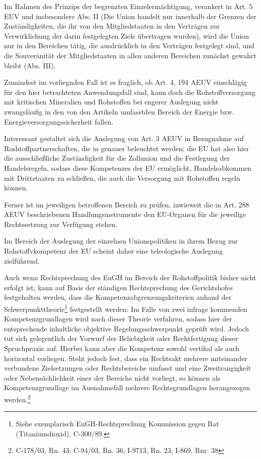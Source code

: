 \documentclass[12pt,a4paper,oneside]{book} %
\begin{document}
	Im Rahmen des Prinzips der begrenzten Einzelermächtigung, verankert in Art. 5 EUV  und insbesondere Abs. II (Die Union handelt nur innerhalb der Grenzen der Zuständigkeiten, die ihr von den Mitgliedstaaten in den Verträgen zur Verwirklichung der darin festgelegten Ziele übertragen wurden), wird die Union nur in den Bereichen tätig, die ausdrücklich in den Verträgen festgelegt sind, und  die Souveränität der Mitgliedstaaten in allen anderen Bereichen zunächst gewahrt bleibt (Abs. III).
	
	Zumindest im vorliegnden Fall ist es fraglich, ob Art. 4, 194 AEUV einschlägig für den hier betrachteten Anwendungsfall sind, kann doch die Rohstoffversorgung mit kritischen Mineralien und Rohstoffen bei engerer Auslegung nicht zwangsläufig in den von den Artikeln umfasstden Bereich der Energie bzw. Energieversorgungssicherheit fallen.
	
	Interessant gestaltet sich die Auslegung von Art. 3 AEUV in Bezugnahme auf Roshtoffpartnerschaften, die in %
	genauer beleuchtet werden; die EU hat also hier die ausschließliche Zuständigkeit für die Zollunion und die Festlegung der Handelsregeln, sodass diese Kompetenzes der EU ermöglicht, Handelsabkommen mit Drittstaaten zu schließen, die auch die Versorgung mit Rohstoffen regeln können.
	
	Ferner ist im jeweiligen betroffenen Bereich zu prüfen, inwieweit die in Art. 288 AEUV beschriebenen Handlungsinstrumente den EU-Organen für die jeweilige Rechtssetzung zur Verfügung stehen.
	
	Im Bereich der Auslegung der einzelnen Unionspolitiken in ihrem Bezug zur Rohstoffvkompetenz der EU scheint daher eine teleologische Auslegung zielführend.
	
	Auch wenn Rechtsprechung des EuGH im Bereich der Rohstoffpolitik bisher nicht erfolgt ist, kann auf Basis der ständigen Rechtsprechung des Gerichtshofes festgehalten werden, dass die Kompetenzabgrenzungskriterien anhand der \glqq Schwerpunkttheorie\grqq\footnote{Siehe exemplarisch EuGH-Rechtsprechung Kommission gegen Rat (Titaniumdioxid), C-300/89.} festgestellt werden: Im Falle von zwei infrage kommenden Kompetenzgrundlagen wird nach dieser Theorie verfahren, sodass hier der entsprechende inhaltliche objektive Regelungsschwerpunkt geprüft wird\autocite[Callies, Art. 175, Rn 22 sowie Kahl, Art. 95, Rn 73ff]{callies_euvaeuv_2022}. Jedoch tut sich gelegentlich der Vorwurf der Beliebigkeit oder Rechtfertigung dieser Spruchpraxis auf.\autocite{Nettesheim, Grabits/Hilf/Nettesheim, AEUV Art 194 Rn. 35} Hierbei kann aber die Kompetenz sowohl vertikal als auch horizontal vorliegen.\autocite[30f.]{callies_stellungnahme_2007} Steht jedoch fest, dass ein Rechtsakt mehrere miteinander verbundene Zielsetzungen oder Rechtsbereiche umfasst und eine Zweitrangigkeit oder Nebensächlichkeit einer der Bereiche nicht vorliegt, so können als Kompetenzgrundlage im Ausnahmefall mehrere Rechtsgrundlagen herangezogen werden.\footnote{C-178/03, Rn. 43; C-94/03, Rn. 36; I-9713, Rn. 23;  I-869, Rnr. 38 }
	
\end{document}
